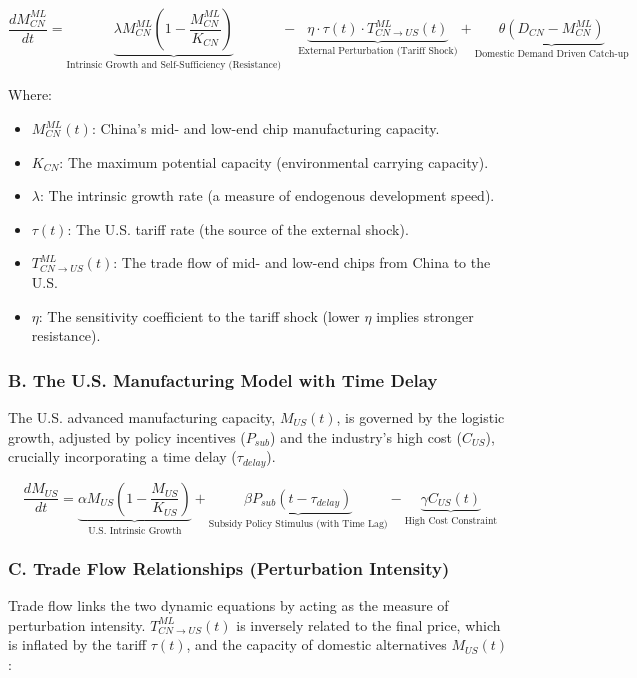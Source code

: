\documentclass[12pt]{article}
\begin{document}
\[
\frac{dM_{CN}^{ML}}{dt} = \underbrace{\lambda M_{CN}^{ML} \left(1 - \frac{M_{CN}^{ML}}{K_{CN}}\right)}_{\text{Intrinsic Growth and Self-Sufficiency (Resistance)}} - \underbrace{\eta \cdot \tau(t) \cdot T_{CN \to US}^{ML}(t)}_{\text{External Perturbation (Tariff Shock)}} + \underbrace{\theta (D_{CN} - M_{CN}^{ML})}_{\text{Domestic Demand Driven Catch-up}}
\]

Where:
\begin{itemize}
    \item $M_{CN}^{ML}(t)$: China's mid- and low-end chip manufacturing capacity.
    \item $K_{CN}$: The maximum potential capacity (environmental carrying capacity).
    \item $\lambda$: The intrinsic growth rate (a measure of endogenous development speed).
    \item $\tau(t)$: The U.S. tariff rate (the source of the external shock).
    \item $T_{CN \to US}^{ML}(t)$: The trade flow of mid- and low-end chips from China to the U.S.
    \item $\eta$: The sensitivity coefficient to the tariff shock (lower $\eta$ implies stronger resistance).
\end{itemize}

\subsubsection{B. The U.S. Manufacturing Model with Time Delay}
The U.S. advanced manufacturing capacity, $M_{US}(t)$, is governed by the logistic growth, adjusted by policy incentives ($P_{sub}$) and the industry's high cost ($C_{US}$), crucially incorporating a time delay ($\tau_{delay}$).

\[
\frac{dM_{US}}{dt} = \underbrace{\alpha M_{US} \left(1 - \frac{M_{US}}{K_{US}}\right)}_{\text{U.S. Intrinsic Growth}} + \underbrace{\beta P_{sub}(t - \tau_{delay})}_{\text{Subsidy Policy Stimulus (with Time Lag)}} - \underbrace{\gamma C_{US}(t)}_{\text{High Cost Constraint}}
\]

\subsubsection{C. Trade Flow Relationships (Perturbation Intensity)}
Trade flow links the two dynamic equations by acting as the measure of perturbation intensity. $T_{CN \to US}^{ML}(t)$ is inversely related to the final price, which is inflated by the tariff $\tau(t)$, and the capacity of domestic alternatives $M_{US}(t)$:
\end{document}
